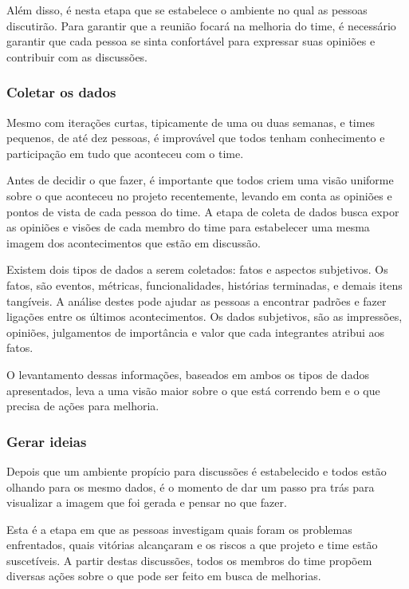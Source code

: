 Além disso, é nesta etapa que se estabelece o ambiente no qual as pessoas discutirão. Para garantir que a reunião focará na melhoria do time, é necessário garantir que cada pessoa se sinta confortável para expressar suas opiniões e contribuir com as discussões.

\subsubsection*{Coletar os dados}

Mesmo com iterações curtas, tipicamente de uma ou duas semanas, e times pequenos, de até dez pessoas, é improvável que todos tenham conhecimento e participação em tudo que aconteceu com o time.

Antes de decidir o que fazer, é importante que todos criem uma visão uniforme sobre o que aconteceu no projeto recentemente, levando em conta as opiniões e pontos de vista de cada pessoa do time. A etapa de coleta de dados busca expor as opiniões e visões de cada membro do time para estabelecer uma mesma imagem dos acontecimentos que estão em discussão.

Existem dois tipos de dados a serem coletados: fatos e aspectos subjetivos. Os fatos, são eventos, métricas, funcionalidades, histórias terminadas, e demais itens tangíveis. A análise destes pode ajudar as pessoas a encontrar padrões e fazer ligações entre os últimos acontecimentos. Os dados subjetivos, são as impressões, opiniões, julgamentos de importância e valor que cada integrantes atribui aos fatos.

O levantamento dessas informações, baseados em ambos os tipos de dados apresentados, leva a uma visão maior sobre o que está correndo bem e o que precisa de ações para melhoria.

\subsubsection*{Gerar ideias}

Depois que um ambiente propício para discussões é estabelecido e todos estão olhando para os mesmo dados, é o momento de dar um passo pra trás para visualizar a imagem que foi gerada e pensar no que fazer. 

Esta é a etapa em que as pessoas investigam quais foram os problemas enfrentados, quais vitórias alcançaram e os riscos a que projeto e time estão suscetíveis. A partir destas discussões, todos os membros do time propõem diversas ações sobre o que pode ser feito em busca de melhorias.

